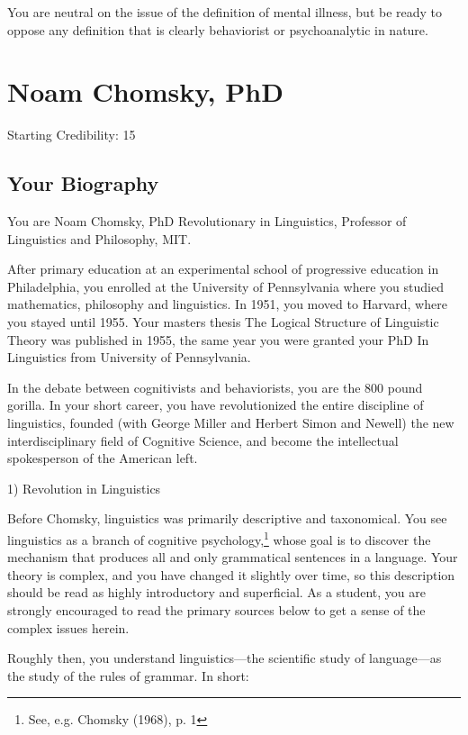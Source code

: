 \begin{refsection}
You are neutral on the issue of the definition of mental illness, but be ready to oppose any definition that is clearly behaviorist or psychoanalytic in nature.

\chapter{Noam Chomsky, PhD}
\label{noamchomskyphd}

Starting Credibility: 15

\section{Your Biography}
\label{yourbiography}

You are Noam Chomsky, PhD Revolutionary in Linguistics, Professor of Linguistics and Philosophy, MIT.

After primary education at an experimental school of progressive education in Philadelphia, you enrolled at the University of Pennsylvania where you studied mathematics, philosophy and linguistics. In 1951, you moved to Harvard, where you stayed until 1955. Your masters thesis The Logical Structure of Linguistic Theory was published in 1955, the same year you were granted your PhD In Linguistics from University of Pennsylvania.

In the debate between cognitivists and behaviorists, you are the 800 pound gorilla. In your short career, you have revolutionized the entire discipline of linguistics, founded (with George Miller and Herbert Simon and Newell) the new interdisciplinary field of Cognitive Science, and become the intellectual spokesperson of the American left.

1) Revolution in Linguistics

Before Chomsky, linguistics was primarily descriptive and taxonomical. You see linguistics as a branch of cognitive psychology,\footnote{See, e.g. Chomsky (1968), p. 1} whose goal is to discover the mechanism that produces all and only grammatical sentences in a language. Your theory is complex, and you have changed it slightly over time, so this description should be read as highly introductory and superficial. As a student, you are strongly encouraged to read the primary sources below to get a sense of the complex issues herein.

Roughly then, you understand linguistics—the scientific study of language—as the study of the rules of grammar. In short:

\begin{quote}


\end{quote}
\end{refsection}
